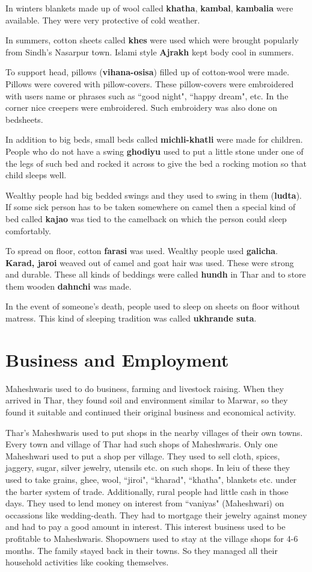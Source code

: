 In winters blankets made up of wool called \textbf{khatha}, \textbf{kambal},
\textbf{kambalia} were available. They were very protective of cold weather.

In summers, cotton sheets called \textbf{khes} were used which were brought
popularly from Sindh's Nasarpur town. Islami style \textbf{Ajrakh} kept body cool in
summers. 

To support head, pillows (\textbf{vihana-osisa}) filled up of cotton-wool were
made. Pillows were covered with pillow-covers. These pillow-covers were
embroidered with users name or phrases such as ``good night", ``happy dream",
etc. In the corner nice creepers were embroidered. Such embroidery was also done
on bedsheets.

In addition to big beds, small beds called \textbf{michli-khatli} were made for
children. People who do not have a swing \textbf{ghodiyu} used to put a little
stone under one of the legs of such bed and rocked it across to give the bed a
rocking motion so that child sleeps well.

Wealthy people had big bedded swings and they used to swing in them
(\textbf{ludta}). If some sick person has to be taken somewhere on camel then a
special kind of bed called \textbf{kajao} was tied to the camelback on which the
person could sleep comfortably.

To spread on floor, cotton \textbf{farasi} was used. Wealthy people used
\textbf{galicha}. \textbf{Karad, jaroi} weaved out of camel and goat hair was
used. These were strong and durable. These all kinds of beddings were called
\textbf{hundh} in Thar and to store them wooden \textbf{dahnchi} was made.

In the event of someone's death, people used to sleep on sheets on floor without
matress. This kind of sleeping tradition was called \textbf{ukhrande suta}.

\section{Business and Employment}
Maheshwaris used to do business, farming and livestock raising. When they
arrived in Thar, they found soil and environment similar to Marwar, so they
found it suitable and continued their original business and economical activity.

Thar's Maheshwaris used to put shops in the nearby villages of their own towns.
Every town and village of Thar had such shops of Maheshwaris. Only one
Maheshwari used to put a shop per village. They used to sell cloth, spices,
jaggery, sugar, silver jewelry, utensils etc. on such shops. In leiu of these
they used to take grains, ghee, wool, ``jiroi", ``kharad", ``khatha", blankets
etc. under the barter system of trade. Additionally, rural people had little
cash in those days. They used to lend money on interest from ``vaniyas"
(Maheshwari) on occassions like wedding-death. They had to mortgage their
jewelry against money and had to pay a good amount in interest. This interest
business used to be profitable to Maheshwaris. Shopowners used to stay at the
village shops for 4-6 months. The family stayed back in their towns. So they
managed all their household activities like cooking themselves.

